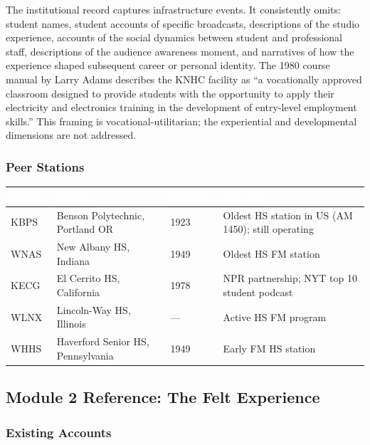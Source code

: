 \documentclass[11pt,letterpaper]{article}
\newcommand{\tableheader}[1]{\textbf{\sffamily\textcolor{white}{#1}}}
\begin{document}
The institutional record captures infrastructure events. It consistently omits: student names, student accounts of specific broadcasts, descriptions of the studio experience, accounts of the social dynamics between student and professional staff, descriptions of the audience awareness moment, and narratives of how the experience shaped subsequent career or personal identity. The 1980 course manual by Larry Adams describes the KNHC facility as ``a vocationally approved classroom designed to provide students with the opportunity to apply their electricity and electronics training in the development of entry-level employment skills.'' This framing is vocational-utilitarian; the experiential and developmental dimensions are not addressed.

\subsubsection{Peer Stations}

\begin{center}
\begin{tabularx}{\textwidth}{L{2cm}L{3cm}L{2cm}X}
\toprule
{}
\tableheader{Station} & \tableheader{School} & \tableheader{Founded} & \tableheader{Notable} \\
\midrule
KBPS & Benson Polytechnic, Portland OR & 1923 & Oldest HS station in US (AM 1450); still operating \\
WNAS & New Albany HS, Indiana & 1949 & Oldest HS FM station \\
KECG & El Cerrito HS, California & 1978 & NPR partnership; NYT top 10 student podcast \\
WLNX & Lincoln-Way HS, Illinois & --- & Active HS FM program \\
WHHS & Haverford Senior HS, Pennsylvania & 1949 & Early FM HS station \\
\bottomrule
\end{tabularx}
\end{center}

\subsection{Module 2 Reference: The Felt Experience}

\subsubsection{Existing Accounts}
\end{document}
